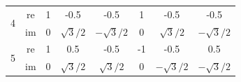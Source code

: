 \begin{center}
\begin{tabular}{| c c c c c c c c |}
		\hline\hline
		\multirow{2}{*}{4}         & re                           & 1                            & -0.5                         & -0.5                         & 1                            & -0.5                          & -0.5          \\
		                           & im                           & 0                            & $\sqrt{3}/2$                 & $-\sqrt{3}/2$                & 0                            & $\sqrt{3}/2$                  & $-\sqrt{3}/2$ \\
		\hline\hline
		\multirow{2}{*}{5}         & re                           & 1                            & 0.5                          & -0.5                         & -1                           & -0.5                          & 0.5           \\
		                           & im                           & 0                            & $\sqrt{3}/2$                 & $\sqrt{3}/2$                 & 0                            & $-\sqrt{3}/2$                 & $-\sqrt{3}/2$ \\
		\hline
	\end{tabular}
\end{center}


